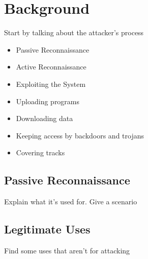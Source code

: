 \section{Background}
Start by talking about the attacker's process
\begin{itemize}
	\item Passive Reconnaissance
	\item Active Reconnaissance
	\item Exploiting the System
	\item Uploading programs
	\item Downloading data
	\item Keeping access by backdoors and trojans
	\item Covering tracks
\end{itemize}

\subsection{Passive Reconnaissance}
Explain what it's used for.
Give a scenario

\subsection{Legitimate Uses}
Find some uses that aren't for attacking